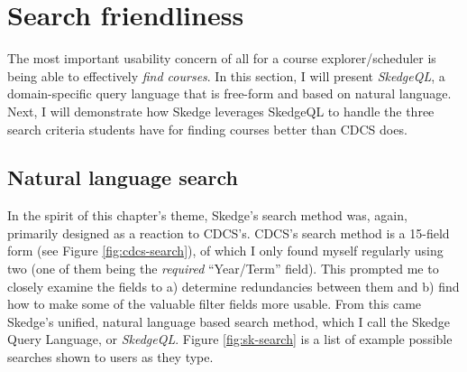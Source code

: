 
\section{Search friendliness}

The most important usability concern of all for a course explorer/scheduler is being able to effectively \emph{find courses}. In this section, I will present \emph{SkedgeQL}, a domain-specific query language that is free-form and based on natural language. Next, I will demonstrate how Skedge leverages SkedgeQL to handle the three search criteria students have for finding courses better than CDCS does.

\subsection{Natural language search}

In the spirit of this chapter's theme, Skedge's search method was, again, primarily designed as a reaction to CDCS's. CDCS's search method is a 15-field form (see Figure \ref{fig:cdcs-search}), of which I only found myself regularly using two (one of them being the \emph{required} ``Year/Term'' field). This prompted me to closely examine the fields to a) determine redundancies between them and b) find how to make some of the valuable filter fields more usable. From this came Skedge's unified, natural language based search method, which I call the Skedge Query Language, or \emph{SkedgeQL}. Figure \ref{fig:sk-search} is a list of example possible searches shown to users as they type.


